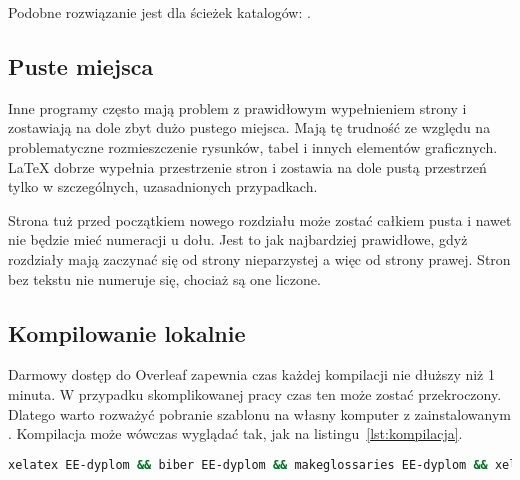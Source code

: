 Podobne rozwiązanie jest dla ścieżek katalogów: .

\subsection{Puste miejsca}
Inne programy często mają problem z prawidłowym wypełnieniem strony i zostawiają na dole zbyt dużo pustego miejsca. Mają tę trudność ze względu na problematyczne rozmieszczenie rysunków, tabel i innych elementów graficznych. \LaTeX{} dobrze wypełnia przestrzenie stron i zostawia na dole pustą przestrzeń tylko w szczególnych, uzasadnionych przypadkach.

Strona tuż przed początkiem nowego rozdziału może zostać całkiem pusta i nawet nie będzie mieć numeracji u dołu. Jest to jak najbardziej prawidłowe, gdyż rozdziały mają zaczynać się od strony nieparzystej a więc od strony prawej. Stron bez tekstu nie numeruje się, chociaż są one liczone.

\subsection{Kompilowanie lokalnie}
Darmowy dostęp do Overleaf zapewnia czas każdej kompilacji nie dłuższy niż 1 minuta. W przypadku skomplikowanej pracy czas ten może zostać przekroczony. Dlatego warto rozważyć pobranie szablonu na własny komputer z zainstalowanym . Kompilacja może wówczas wyglądać tak, jak na listingu~\ref{lst:kompilacja}.

\begin{lstlisting}[language=bash,
    caption={Kompilacja pracy dyplomowej lokalnie},
    label={lst:kompilacja}]
xelatex EE-dyplom && biber EE-dyplom && makeglossaries EE-dyplom && xelatex EE-dyplom && xelatex EE-dyplom
\end{lstlisting}
